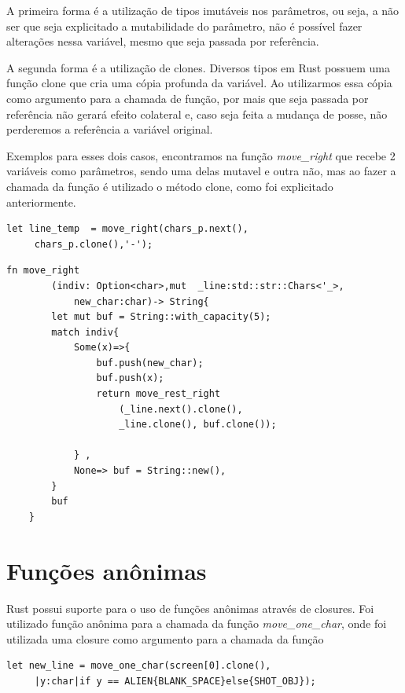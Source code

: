 \documentclass[rel_mlp]{iiufrgs}
\begin{document}
A primeira forma é a utilização de tipos imutáveis nos parâmetros, ou seja, a não ser que seja explicitado a mutabilidade do parâmetro, não é possível fazer alterações nessa variável, mesmo que seja passada por referência.

A segunda forma é a utilização de clones. Diversos tipos em Rust possuem uma função clone que cria uma cópia profunda da variável. Ao utilizarmos essa cópia como argumento para a chamada de função, por mais que seja passada por referência não gerará efeito colateral e, caso seja feita a mudança de posse, não perderemos a referência a variável original.

Exemplos para esses dois casos, encontramos na função \textit{move\_right} que recebe 2 variáveis como parâmetros, sendo uma delas mutavel e outra não, mas ao fazer a chamada da função é utilizado o método clone, como foi explicitado anteriormente.


\begin{lstlisting}[frame = single]
    let line_temp  = move_right(chars_p.next(),
     chars_p.clone(),'-');

\end{lstlisting}
\begin{lstlisting}[frame=single, label ={lst:purefn}]
    fn move_right
        (indiv: Option<char>,mut  _line:std::str::Chars<'_>,
            new_char:char)-> String{
        let mut buf = String::with_capacity(5);
        match indiv{
            Some(x)=>{
                buf.push(new_char);
                buf.push(x);
                return move_rest_right
                    (_line.next().clone(),
                    _line.clone(), buf.clone());
                
            } ,
            None=> buf = String::new(),
        }
        buf
    }
\end{lstlisting}


    

 
 




\section{Funções anônimas}
Rust possui suporte para o uso de funções anônimas através de closures. Foi utilizado função anônima para a chamada da função \textit{move\_one\_char}, onde foi utilizada uma closure como argumento para a chamada da função

\begin{lstlisting}[frame=single, label = {lst:anon}]
    let new_line = move_one_char(screen[0].clone(),
     |y:char|if y == ALIEN{BLANK_SPACE}else{SHOT_OBJ});


\end{lstlisting}
\end{document}

